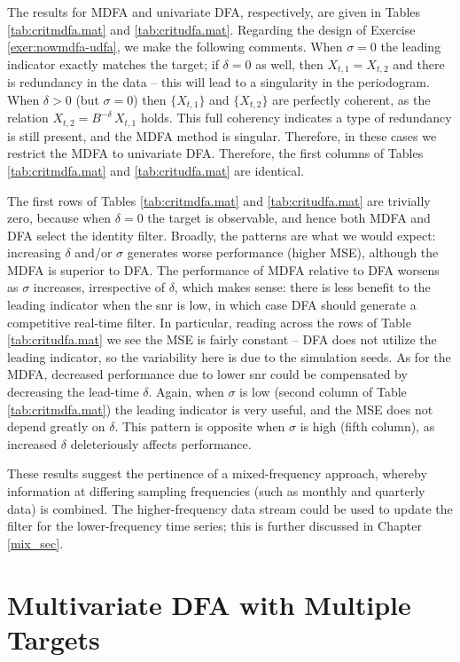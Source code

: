 \documentclass[a4paper]{book}
\begin{document}
 The results for MDFA and univariate DFA, respectively, are given in 
Tables \ref{tab:critmdfa.mat} and \ref{tab:critudfa.mat}.
Regarding the design of Exercise \ref{exer:nowmdfa-udfa}, we make the following 
comments.  When $\sigma = 0$ the leading indicator exactly matches the target;
 if $\delta = 0$ as well, then $X_{t,1} = X_{t,2}$ and there is redundancy in
 the data -- this will lead to a singularity in the periodogram.  When 
 $\delta > 0$ (but $\sigma = 0$) then $\{ X_{t,1} \}$ and $\{ X_{t,2} \}$
 are perfectly coherent, as the relation $X_{t,2} = B^{-\delta} \, X_{t,1}$ holds.
 This full coherency indicates a type of redundancy is still present,
 and the MDFA method is singular.  Therefore, in these cases we restrict
 the MDFA to univariate DFA.  Therefore, the first columns of 
 Tables \ref{tab:critmdfa.mat} and \ref{tab:critudfa.mat} are identical.

 The first rows of Tables \ref{tab:critmdfa.mat} and \ref{tab:critudfa.mat}
 are trivially zero, because when $\delta = 0$ the target is observable,
 and hence both MDFA and DFA select the identity filter.  
 Broadly, the patterns are what we would expect: increasing $\delta$ and/or
 $\sigma$ generates worse performance (higher MSE), although the MDFA is
 superior to DFA.  The performance of MDFA relative to DFA worsens as 
 $\sigma$ increases, irrespective of $\delta$, which makes sense: there
 is less benefit to the leading indicator when the snr is low, in which
 case DFA should generate a competitive real-time filter.
  In particular, reading across the rows of Table \ref{tab:critudfa.mat}
 we see the MSE is fairly constant -- DFA does not utilize the leading indicator,
 so the variability here is due to the simulation seeds.
  As for the MDFA, decreased performance due to lower snr could be 
 compensated by decreasing the lead-time $\delta$.  
  Again, when $\sigma$ is low (second column of Table \ref{tab:critmdfa.mat})
  the leading indicator is very useful, and the MSE does not depend 
 greatly on $\delta$.  This pattern is opposite when $\sigma$ is high 
 (fifth column), as increased $\delta$ deleteriously affects performance.

   
These results suggest the pertinence of a mixed-frequency approach,
 whereby information at differing sampling frequencies (such as monthly
 and quarterly data) is combined.  The higher-frequency data stream
 could be used to update the filter for the lower-frequency time series;
 this is further discussed in Chapter \ref{mix_sec}. 
 
\section{Multivariate DFA with Multiple Targets}
 
\end{document}
